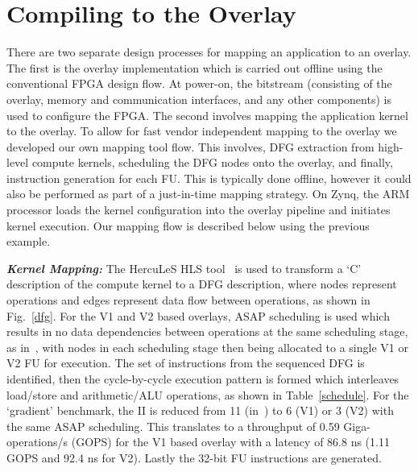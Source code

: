 \section{Compiling to the Overlay}
\label{ch4_tool}
There are two separate design processes for mapping an application to an overlay. The first is the overlay implementation which is carried out offline using the conventional FPGA design flow. 
At power-on, the bitstream (consisting of the overlay, memory and communication interfaces, and any other components) is used to configure the FPGA.
The second involves mapping the application kernel to the overlay.
To allow for fast vendor independent mapping to the overlay we developed our own mapping tool flow.
This involves, DFG extraction from high-level compute kernels, scheduling the DFG nodes onto the overlay, and finally, instruction generation for each FU. This is typically done offline, however it could also be performed as part of a just-in-time mapping strategy.
On Zynq, the ARM processor loads the kernel configuration into the overlay pipeline and initiates kernel execution.
Our mapping flow is described below using the previous example.

\textbf{\textit{Kernel Mapping:}} The HercuLeS HLS tool~\cite{kavvadias2013hardware} is used to transform a `C' description of the compute kernel to a DFG description, where nodes represent operations and edges represent data flow between operations, as shown in Fig.~\ref{dfg}.
For the V1 and V2 based overlays, ASAP scheduling is used which results in no data dependencies between operations at the same scheduling stage, as in~\cite{li2016area}, with nodes in each scheduling stage then being allocated to a single V1 or V2 FU for execution. 
The set of instructions from the sequenced DFG is identified, then the cycle-by-cycle execution pattern is formed which interleaves load/store and arithmetic/ALU operations, as shown in Table~\ref{schedule}. 
For the `gradient' benchmark, the II is reduced from 11 (in~\cite{li2016area}) to 6 (V1) or 3 (V2) with the same ASAP scheduling.
This translates to a throughput of 0.59 Giga-operations/s (GOPS) for the V1 based overlay with a latency of 86.8 ns (1.11 GOPS and 92.4 ns for V2). 
Lastly the 32-bit FU instructions are generated.

